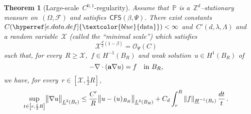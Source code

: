 \documentclass[11pt,twoside]{article} %
\numberwithin{equation}{section}
\newtheorem{theorem}{Theorem}[section]
\theoremstyle{definition}
\newcommand{\dataref}{\hyperref[e.data.def]{\textcolor{blue}{\ensuremath{\mathrm{data}}}}}
\let\originalleft\left
\let\originalright\right
\renewcommand{\left}{\mathopen{}\mathclose\bgroup\originalleft}
\renewcommand{\right}{\aftergroup\egroup\originalright}
\newcommand*{\Zd}{\ensuremath{\mathbb{Z}^d}}
\renewcommand{\a}{\mathbf{a}}
\newcommand{\F}{\mathcal{F}}
\renewcommand{\P}{\mathbb{P}}
\newcommand{\X}{\mathcal{X}}
\renewcommand{\O}{\mathcal{O}}
\newcommand{\CFS}{\mathsf{CFS}}
\begin{document}
\begin{theorem}[{Large-scale~$C^{0,1}$-regularity}]
\label{t.C01}
Assume that~$\P$ is a~$\Zd$--stationary measure on~$(\Omega,\F)$ and satisfies~$\CFS(\beta,\Psi)$. 
There exist constants~$C(\dataref)<\infty$ and~$C'(d,\lambda,\Lambda)$ and a random variable~$\X$ (called the ``minimal scale'') which satisfies
\begin{equation}
\label{e.XLipschitz}
\X^{\frac d2(1-\beta)} 
= 
\O_{\Psi}(C) 
\end{equation}
such that, for every~$R\geq \X$,~$f\in H^{-1}(B_R)$ and weak solution~$u\in H^1(B_{R})$ of
\begin{equation} 
\label{e.wksrt2}
-\nabla \cdot \left( \a\nabla u \right) = f \quad \mbox{in} \ B_{R},
\end{equation}
we have, for every~$r \in [\X, \frac12 R]$, 
\begin{equation}
\label{e.Lipschitz}
\sup_{ t \in \left[r , \frac12 R\right]} \bigl\| \nabla u \bigr\|_{\underline{L}^2(B_{t})}
\leq
\frac{C'}{R} \bigl\| u - ( u )_{B_{R}} \bigr\|_{\underline{L}^2(B_{R})} 
+ C_d \int_{r}^R \| f \|_{\underline{H}^{-1}(B_t)} \, \frac{dt}{t}
\,.
\end{equation}
\end{theorem}
\end{document}
